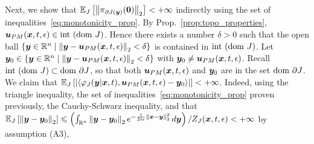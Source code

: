 Next, we show that $\expectationJ{\normtwo{\pi_{\partial J(\by)}(\boldsymbol{0})}} < +\infty$ indirectly using the set of inequalities~\eqref{eq:monotonicity_prop}. By Prop.~\ref{prop:topo_properties}, $\bu_{PM}(\bx,t,\epsilon)\in \inter(\dom J)$. Hence there exists a number $\delta>0$ such that the open ball $\{\by \in \Rn \mid \normtwo{\by-\bu_{PM}(\bx,t,\epsilon)} < \delta\}$ is contained in $\inter(\dom J)$. Let $\by_0 \in \{\by \in \Rn \mid \normtwo{\by-\bu_{PM}(\bx,t,\epsilon)} < \delta\}$ with $\by_0 \neq \bu_{PM}(\bx,t,\epsilon)$. Recall $\inter(\dom J) \subset \dom \partial J$, so that both $\bu_{PM}(\bx,t,\epsilon)$ and $\by_0$ are in the set $\dom \partial J$. We claim that $\expectationJ{\left|\left\langle \varphi_{J}(\by|\bx,t),\bu_{PM}(\bx,t,\epsilon)-\by_0\right\rangle\right|} < +\infty$. Indeed, using the triangle inequality, the set of inequalities~\eqref{eq:monotonicity_prop} proven previously, the Cauchy-Schwarz inequality, and that $\expectationJ{\normtwo{\by-\by_0}} \leqslant \left(\int_{\Rn} \normtwo{\by-\by_0}e^{-\frac{1}{2t\epsilon}\normsq{\bx-\by}} \diff \by \right)/Z_J(\bx,t,\epsilon) < +\infty$ by assumption (A3),
\beq\label{eq:appD_ineq_scalar_prod}
